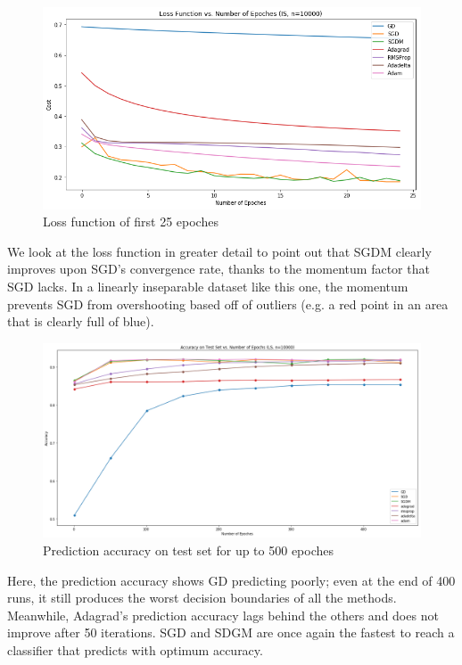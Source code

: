 \documentclass[twoside,11pt]{homework}
\begin{document}
	\begin{figure}[H]
		\centering
		\includegraphics[scale=.5]{q5/insep_10000/loss_n25.png}	
		\caption{Loss function of first 25 epoches}
	\end{figure}

We look at the loss function in greater detail to point out that SGDM clearly improves upon SGD's convergence rate, thanks to the momentum factor that SGD lacks. In a linearly inseparable dataset like this one, the momentum prevents SGD from overshooting based off of outliers (e.g. a red point in an area that is clearly full of blue).
	
	\begin{figure}[H]
		\centering
		\includegraphics[scale=.3]{q5/insep_10000/acc_500.png}	
		\caption{Prediction accuracy on test set for up to 500 epoches}
	\end{figure}

Here, the prediction accuracy shows GD predicting poorly; even at the end of 400 runs, it still produces the worst decision boundaries of all the methods. Meanwhile, Adagrad's prediction accuracy lags behind the others and does not improve after 50 iterations. SGD and SDGM are once again the fastest to reach a classifier that predicts with optimum accuracy.
\end{document}
